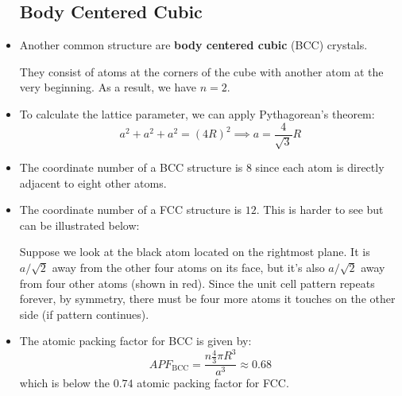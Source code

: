 \begin{itemize}
    \subsection{Body Centered Cubic}
    \item Another common structure are \textbf{body centered cubic} (BCC) crystals.
    \begin{center}
    \end{center}
    They consist of atoms at the corners of the cube with another atom at the very beginning. As a result, we have $n=2$.
    \item To calculate the lattice parameter, we can apply Pythagorean's theorem:
    \begin{equation}
        a^2+a^2+a^2 = (4R)^2 \implies a = \frac{4}{\sqrt{3}}R
    \end{equation}
    \item The coordinate number of a BCC structure is $8$ since each atom is directly adjacent to eight other atoms.
    \item The coordinate number of a FCC structure is $12$. This is harder to see but can be illustrated below:
    \begin{center}
    \end{center}
    Suppose we look at the black atom located on the rightmost plane. It is $a/\sqrt{2}$ away from the other four atoms on its face, but it's also $a/\sqrt{2}$ away from four other atoms (shown in red). Since the unit cell pattern repeats forever, by symmetry, there must be four more atoms it touches on the other side (if pattern continues).
    \item The atomic packing factor for BCC is given by:
    \begin{equation}
        APF_\text{BCC} = \frac{n\frac{4}{3}\pi R^3}{a^3} \approx 0.68
    \end{equation}
    which is below the $0.74$ atomic packing factor for FCC.

\end{itemize}

